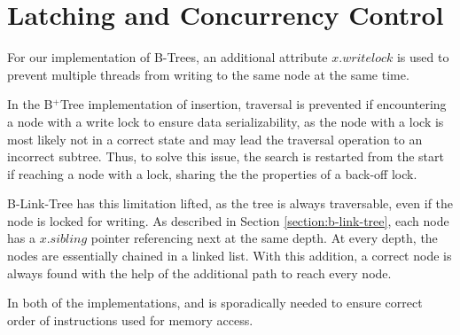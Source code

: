 \section{Latching and Concurrency Control}

For our implementation of B-Trees, an additional attribute $x.writelock$ is used to prevent multiple threads from writing to the same node at the same time.

In the B$^+$Tree implementation of insertion, traversal is prevented if encountering a node with a write lock to ensure data serializability, as the node with a lock is most likely not in a correct state and may lead the traversal operation to an incorrect subtree. Thus, to solve this issue, the search is restarted from the start if reaching a node with a lock, sharing the the properties of a back-off lock.

B-Link-Tree has this limitation lifted, as the tree is always traversable, even if the node is locked for writing. As described in Section \ref{section:b-link-tree}, each node has a $x.sibling$ pointer referencing next at the same depth. At every depth, the nodes are essentially chained in a linked list. With this addition, a correct node is always found with the help of the additional path to reach every node.

In both of the implementations,  and  is sporadically needed to ensure correct order of instructions used for memory access.